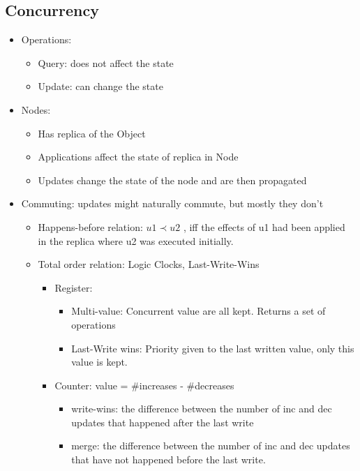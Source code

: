 \documentclass{article}
\begin{document}
\subsection{Concurrency}
\begin{itemize}
    \item Operations:
    \begin{itemize}
        \item Query: does not affect the state
        \item Update: can change the state
    \end{itemize}
    \item Nodes:
    \begin{itemize}
        \item Has replica of the Object
        \item Applications affect the state of replica in Node
        \item Updates change the state of the node and are then propagated
    \end{itemize}
    \item Commuting: updates might naturally commute, but mostly they don't
    \begin{itemize}
        \item Happens-before relation: $u1 \prec u2$ , iff the effects of u1 had been applied in the replica where u2 was executed initially.
        \item Total order relation: Logic Clocks, Last-Write-Wins
        \begin{itemize}
            \item Register: 
            \begin{itemize}
                \item Multi-value: Concurrent value are all kept. Returns a set of operations
                \item Last-Write wins: Priority given to the last written value, only this value is kept.
            \end{itemize}
            \item Counter: value = \#increases - \#decreases
            \begin{itemize}
                \item write-wins: the difference between the number of inc and dec updates that happened after the last write
                \item merge: the difference between the number of inc and dec updates that have not happened before the last write.
            \end{itemize}

\end{itemize}
\end{itemize}
\end{itemize}
\end{document}
